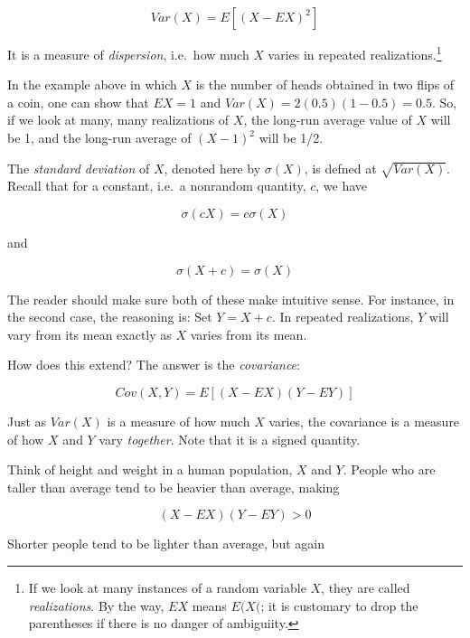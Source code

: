 \begin{equation}
Var(X) = E[(X - EX)^2]
\end{equation}

It is a measure of \textit{dispersion}, i.e.\ how much $X$
varies in repeated realizations.\footnote{If we look at many instances
of a random variable $X$, they are called \textit{realizations}.  By the
way, $EX$ means $E(X($; it is customary to drop the parentheses if there
is no danger of ambiguiity.}

In the example above in which $X$ is the number of heads obtained in two
flips of a coin, one can show that $EX = 1$ and
$Var(X) = 2(0.5)(1-0.5) = 0.5$.  So, if we look at many, many
realizations of $X$, the long-run average value of $X$ will be 1,
and the long-run average of $(X - 1)^2$ will be 1/2.

The \textit{standard deviation} of $X$, denoted here by $\sigma(X)$,
is defned at $\sqrt{Var(X)}$.  Recall that for a constant, i.e.\ a
nonrandom quantity, $c$, we have

\begin{equation}
\sigma(cX) = c \sigma(X)
\end{equation}

and 

\begin{equation}
\sigma(X+c) = \sigma(X)
\end{equation}

The reader should make sure both of these make intuitive sense.  For
instance, in the second case, the reasoning is:  Set $Y = X + c$.  In
repeated realizations, $Y$ will vary from its mean exactly as $X$
varies from its mean.

How does this extend?  The answer is the \textit{covariance}:

\begin{equation}
Cov(X,Y) = E[(X - EX) (Y - EY)]
\end{equation}

Just as $Var(X)$ is a measure of how much $X$ varies, the covariance is
a measure of how $X$ and $Y$ vary \textit{together}.  Note that it is a
signed quantity.

Think of height and weight in a human population, $X$ and $Y$. People
who are taller than average tend to be heavier than average, making

\begin{equation}
(X - EX) (Y - EY) > 0
\end{equation}

Shorter people tend to be lighter than average, but again

